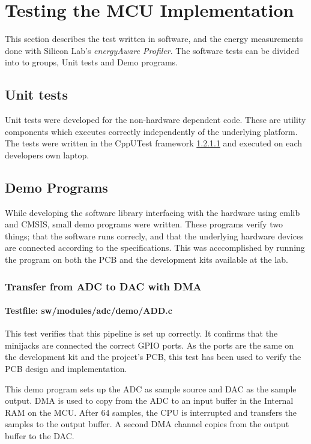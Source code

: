 \section{Testing the MCU Implementation}

This section describes the test written in software, and the energy measurements
done with Silicon Lab's \textit{energyAware Profiler}. The software tests can be
divided into to groups, Unit tests and Demo programs.

\subsection{Unit tests}

Unit tests were developed for the non-hardware dependent code. These are
utility components which executes correctly independently of the underlying
platform. The tests were written in the CppUTest framework \ref{} and executed
on each developers own laptop.

\subsection{Demo Programs}

While developing the software library interfacing with the hardware using emlib
and CMSIS, small demo programs were written. These programs verify two things;
that the software runs correcly, and that the underlying hardware devices are
connected according to the specifications. This was acccomplished by running the
program on both the PCB and the development kits available at the lab.

\subsubsection{Transfer from ADC to DAC with DMA}
\paragraph{Testfile: sw/modules/adc/demo/ADD.c}

This test verifies that this pipeline is set up correctly. It confirms that the
minijacks are connected the correct GPIO ports. As the ports are the same on the
development kit\cite{efm32gg-devkit} and the project's PCB, this test has been used to verify
the PCB design and implementation.

This demo program sets up the ADC as sample source and DAC as the sample output.
DMA is used to copy from the ADC to an input buffer in the Internal RAM on the
MCU. After 64 samples, the CPU is interrupted and transfers the samples to the
output buffer. A second DMA channel copies from the output buffer to the DAC.

